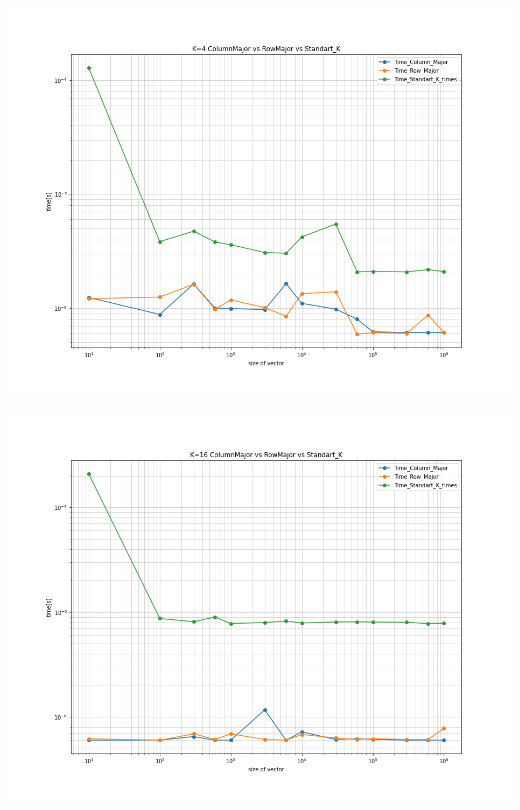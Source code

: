 \documentclass[11pt,a4paper]{article}
\begin{document}
\begin{center}
	
	\begin{minipage}[t]{0.49\textwidth}
		\includegraphics[width=\textwidth]{Bilder/K=4_ColumnMajor_vs_RowMajor_vs_Standart_K.png}
	\end{minipage}
	\begin{minipage}[t]{0.49\textwidth}
		\includegraphics[width=\textwidth]{Bilder/K=8_ColumnMajor_vs_RowMajor_vs_Standart_K.png}
	\end{minipage}
	
\end{center}
\end{document}
